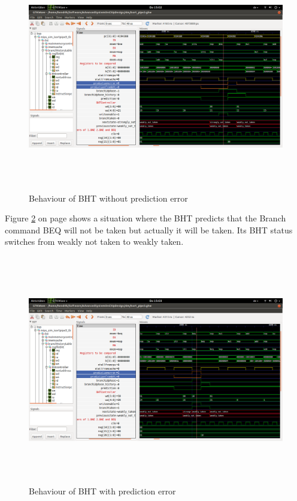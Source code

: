 \begin{figure}
	\centering
	\includegraphics[width=1\textwidth, height=10cm, keepaspectratio]{pictures/BHT_BranchNotTakenPred0Err0}
	\caption{Behaviour of BHT without prediction error}
	\label{fig5-1}
\end{figure}

Figure \ref{fig5-2} on page \pageref{fig5-2} shows a situation where the BHT predicts that the Branch command BEQ will not be taken but actually it will be taken. Its BHT status switches from weakly not taken to weakly taken.


\begin{figure}
	\centering
	\includegraphics[width=1\textwidth, height=10cm, keepaspectratio]{pictures/BHT_BranchTakenPred0Err1}
	\caption{Behaviour of BHT with prediction error}
	\label{fig5-2}
\end{figure}




